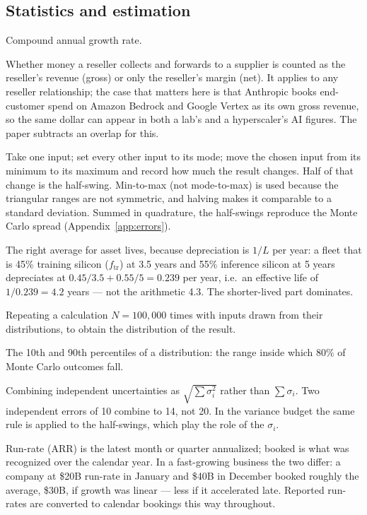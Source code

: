 \documentclass[11pt,letterpaper]{article}
\begin{document}
\subsection*{Statistics and estimation}
\begin{description}\setlength{\itemsep}{1pt}
\item[CAGR] Compound annual growth rate.
\item[Gross vs net basis] Whether money a reseller collects and forwards to a supplier is counted as the reseller's revenue (gross) or only the reseller's margin (net). It applies to any reseller relationship; the case that matters here is that Anthropic books end-customer spend on Amazon Bedrock and Google Vertex as its own gross revenue, so the same dollar can appear in both a lab's and a hyperscaler's AI figures. The paper subtracts an overlap for this.
\item[Half-swing] Take one input; set every other input to its mode; move the chosen input from its minimum to its maximum and record how much the result changes. Half of that change is the half-swing. Min-to-max (not mode-to-max) is used because the triangular ranges are not symmetric, and halving makes it comparable to a standard deviation. Summed in quadrature, the half-swings reproduce the Monte Carlo spread (Appendix~\ref{app:errors}).
\item[Harmonic mean] The right average for asset lives, because depreciation is $1/L$ per year: a fleet that is 45\% training silicon ($f_{\text{tr}}$) at 3.5 years and 55\% inference silicon at 5 years depreciates at $0.45/3.5+0.55/5=0.239$ per year, i.e.\ an effective life of $1/0.239=4.2$ years --- not the arithmetic 4.3. The shorter-lived part dominates.
\item[Monte Carlo (MC)] Repeating a calculation $N=100{,}000$ times with inputs drawn from their distributions, to obtain the distribution of the result.
\item[P10 / P90] The 10th and 90th percentiles of a distribution: the range inside which 80\% of Monte Carlo outcomes fall.
\item[Quadrature / root-sum-square (RSS)] Combining independent uncertainties as $\sqrt{\sum\sigma_i^2}$ rather than $\sum\sigma_i$. Two independent errors of 10 combine to 14, not 20. In the variance budget the same rule is applied to the half-swings, which play the role of the $\sigma_i$.
\item[Run-rate vs booked] Run-rate (ARR) is the latest month or quarter annualized; booked is what was recognized over the calendar year. In a fast-growing business the two differ: a company at \$20B run-rate in January and \$40B in December booked roughly the average, \$30B, if growth was linear --- less if it accelerated late. Reported run-rates are converted to calendar bookings this way throughout.

\end{description}
\end{document}
